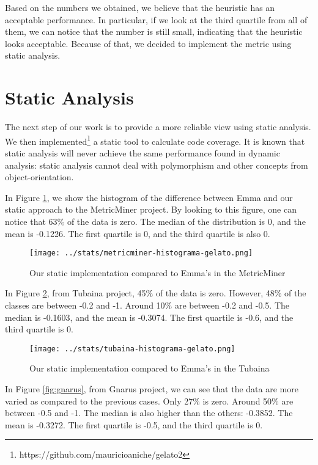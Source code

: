 \documentclass{sig-alternate}
\begin{document}
Based on the numbers we obtained, we believe that the heuristic has an acceptable performance. 
In particular, if we look at the third quartile from all of them, we can notice that the number is
still small, indicating that the heuristic looks acceptable. Because of that,
we decided to implement the metric using static analysis. 

\section{Static Analysis}
\label{sec-results}

The next step of our work is to provide a more reliable view using static analysis. 
We then implemented\footnote{https://github.com/mauricioaniche/gelato2} a static tool
to calculate code coverage. It is known that static analysis will never achieve the same performance
found in dynamic analysis: static analysis cannot deal with polymorphism and other concepts from object-orientation.

In Figure \ref{fig:metricminer}, we show the histogram of the difference between Emma and our static approach to
the MetricMiner project. By looking to this figure, one can notice that 63\% of the data is zero. 
The median of the distribution is 0, and the mean is -0.1226. The first quartile is 0, and the
third quartile is also 0.

\begin{figure}[h!H]
  \centering
  \texttt{[image: ../stats/metricminer-histograma-gelato.png]}
  \caption{Our static implementation compared to Emma's in the MetricMiner}
  \label{fig:metricminer}
\end{figure}

In Figure \ref{fig:tubaina}, from Tubaina project, 45\% of the data is zero. 
However, 48\% of the classes are between -0.2 and -1. Around 10\% are between -0.2 and -0.5.
The median is -0.1603, and the mean is -0.3074. The first quartile is
-0.6, and the third quartile is 0.

\begin{figure}[h!H]
  \centering
  \texttt{[image: ../stats/tubaina-histograma-gelato.png]}
  \caption{Our static implementation compared to Emma's in the Tubaina}
  \label{fig:tubaina}
\end{figure}


In Figure \ref{fig:gnarus}, from Gnarus project, we can see that the data are more varied as 
compared to the previous cases. Only 27\% is zero. Around 50\% are between -0.5 and -1. 
The median is also higher than the others: -0.3852. The mean is -0.3272. The first quartile
is -0.5, and the third quartile is 0.
\end{document}
